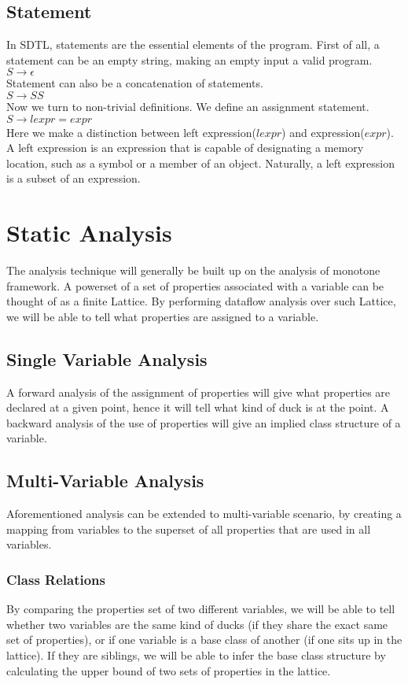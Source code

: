 \documentclass[a4paper,12pt]{article}
\begin{document}
\subsection{Statement}
In SDTL, statements are the essential elements of the program. First of all, a statement can be an empty string, making an empty input a valid program.\\
$S \rightarrow \epsilon$\\
Statement can also be a concatenation of statements.\\
$S \rightarrow S S$\\
Now we turn to non-trivial definitions. We define an assignment statement.\\
$S \rightarrow lexpr = expr$\\
Here we make a distinction between left expression($lexpr$) and expression($expr$). A left expression is an expression that is capable of designating a memory location, such as a symbol or a member of an object. Naturally, a left expression is a subset of an expression.\\


\section{Static Analysis}
The analysis technique will generally be built up on the analysis of monotone framework. A powerset of a set of properties associated with a variable can be thought of as a finite Lattice. By performing dataflow analysis over such Lattice, we will be able to tell what properties are assigned to a variable.\\
\subsection{Single Variable Analysis}
A forward analysis of the assignment of properties will give what properties are declared at a given point, hence it will tell what kind of duck is at the point. A backward analysis of the use of properties will give an implied class structure of a variable.\\
\subsection{Multi-Variable Analysis}
Aforementioned analysis can be extended to multi-variable scenario, by creating a mapping from variables to the superset of all properties that are used in all variables.
\subsubsection{Class Relations}
By comparing the properties set of two different variables, we will be able to tell whether two variables are the same kind of ducks (if they share the exact same set of properties), or if one variable is a base class of another (if one sits up in the lattice). If they are siblings, we will be able to infer the base class structure by calculating the upper bound of two sets of properties in the lattice.
\end{document}
